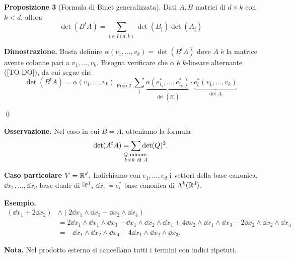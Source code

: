 \textbf{Proposizione 3} (Formula di Binet generalizzata).
Dati $A,B$ matrici di $d \times k$ con $k < d$, allora
%
$$
	\det(B^tA) = \sum_{\underline{i} \in I(d,k)} \det(B_{\underline{i}}) \det (A_{\underline{i}})
$$
%

\textbf{Dimostrazione.} Basta definire $\alpha(v_1,\ldots,v_k) = \det(B^t A)$ dove $A$ è la matrice avente colonne pari a $v_1,\ldots,v_k$.
Bisogna verificare che $\alpha$ è $k$-lineare alternante ([TO DO]), da cui segue che
%
$$
	\det(B^tA) = \alpha(v_1,\ldots,v_k) 
	\underset{\text{Prop 2} }{=} \sum_{\underline{i}} \underbrace{\alpha(e_{i_1}^*,\ldots,e_{i_k}^*)}_{\det(B_{\underline{i}}^t)}
	\cdot \underbrace{e_{\underline{i}}^* (v_1,\ldots,v_k)}_{\det A_i}
$$
%

\qed

\textbf{Osservazione.} Nel caso in cui $B = A$, otteniamo la formula
%
$$
	\det(A^tA) = \sum_{\mathclap{\substack{Q \text{ minore } \\ k \times k \text{ di } A }}} \det(Q)^2.
$$
%


\textbf{Caso particolare $V = \mathbb R^d$.} Indichiamo con $e_1,\ldots,e_d$ i vettori della base canonica, $\dd x_1,\ldots, \dd x_d$ base duale di $\mathbb R^d$, $\dd x_{\underline{i}} \coloneqq e_{\underline{i}}^*$ base canonica di $\Lambda^k(\mathbb R^d)$.


\textbf{Esempio.}
\begin{align*}
	(\dd x_1 + 2 \dd x_2) & \wedge (2 \dd x_1 \wedge \dd x_3 - \dd x_2 \wedge\dd x_4) \\
	& = 2 \dd x_1 \wedge\dd x_1 \wedge\dd x_3 - \dd x_1 \wedge\dd x_2 \wedge \dd x_4 + 4 \dd x_2 \wedge\dd x_1 \wedge\dd x_3 - 2 \dd x_2 \wedge\dd x_2 \wedge\dd x_4 \\
	& = - \dd x_1 \wedge\dd x_2 \wedge\dd x_4 - 4 \dd x_1 \wedge\dd x_2 \wedge\dd x_3.
\end{align*}

\textbf{Nota.} Nel prodotto esterno si cancellano tutti i termini con indici ripetuti.





